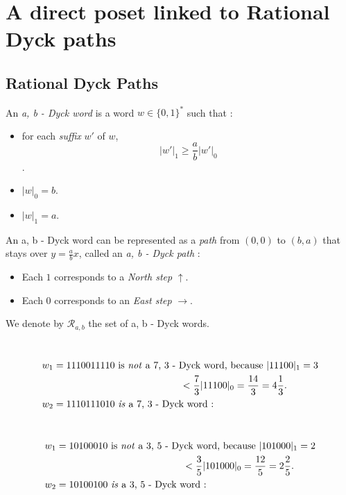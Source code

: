 \section{A direct poset linked to Rational Dyck paths}

\subsection{Rational Dyck Paths}

\begin{definition}
    An \emph{a, b - Dyck word} is a word $w \in \{0,1\}^*$
    such that :
    \begin{itemize}
        \item for each \emph{suffix} $w'$ of $w$,
            $$|w'|_1 \geqslant \frac{a}{b}|w'|_0$$.
        \item $|w|_0 = b$.
        \item $|w|_1 = a$.
    \end{itemize}
\end{definition}

An a, b - Dyck word can be represented as a 
\emph{path} from $(0,0)$ to $(b,a)$ that stays over
$y = \frac{a}{b}x$, called an \emph{a, b - Dyck path} :
\begin{itemize}
    \item Each $1$ corresponds to a \emph{North step}
    $\uparrow$. 
    \item Each $0$ corresponds to an \emph{East step}
    $\rightarrow$.
\end{itemize}
We denote by $\mathcal{R}_{a, b}$ the set of
a, b - Dyck words.

\begin{example}[$a > b : a = 7, b = 3$]
    ~\\
    \begin{align*}
        &w_1 = 1110011110 \text{ is \emph{not} a 7, 3 - Dyck
        word, because } |11100|_1 = 3\\
        & \hspace{5cm} < \frac{7}{3}|11100|_0
        = \frac{14}{3} = 4 \frac{1}{3}.\\
        &w_2 = 1110111010 \text{ \emph{is} a 7, 3 - Dyck 
        word : }\\
    \end{align*}
    
\end{example}

\begin{example}[$a < b : a = 3, b = 5$]
    ~\\
    \begin{align*}
        &w_1 = 10100010 \text{ is \emph{not} a 3, 5 - Dyck
        word, because } |101000|_1 = 2\\
        & \hspace{5cm} < \frac{3}{5}|101000|_0
        = \frac{12}{5} = 2 \frac{2}{5}.\\
        &w_2 = 10100100 \text{ \emph{is} a 3, 5 - Dyck 
        word : }\\
    \end{align*}
    
\end{example}

